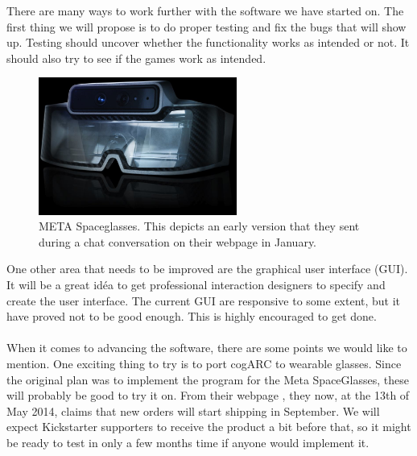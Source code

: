 There are many ways to work further with the software we have started on.
The first thing we will propose is to do proper testing and fix the bugs that
will show up. Testing should uncover whether the functionality works as 
intended or not. It should also try to see if the games work as intended.

\begin{figure}
	\capstart
	\centering
	\vspace{-10pt}
	\includegraphics[width=0.58\textwidth]{images/META1_website_image_resized}
	\vspace{-5pt}
	\caption[{META S}paceglasses - Early version]{{META} Spaceglasses. This
	depicts an early version that they sent during a chat conversation on 
	their webpage in January.}
	\vspace{-10pt}
	\label{fig:meta_spaceglasses}
\end{figure}

One other area that needs to be improved are the graphical user interface (GUI).
It will be a great id\'ea to get professional interaction designers to specify
and create the user interface. The current GUI are responsive to some extent, 
but it have proved not to be good enough. This is highly encouraged to get 
done.

\paragraph{}

When it comes to advancing the software, there are some points we would like 
to mention. One exciting thing to try is to port cogARC to wearable glasses.
Since the original plan was to implement the program for the \gls{Meta 
SpaceGlasses}, these will probably be good to try it on. From their webpage
\cite{MetaSpaceGlasses}, they now, at the 13th of May 2014, claims that new 
orders will start shipping in September. We will expect Kickstarter supporters 
to receive the product a bit before that, so it might be ready to test in only
a few months time if anyone would implement it.

